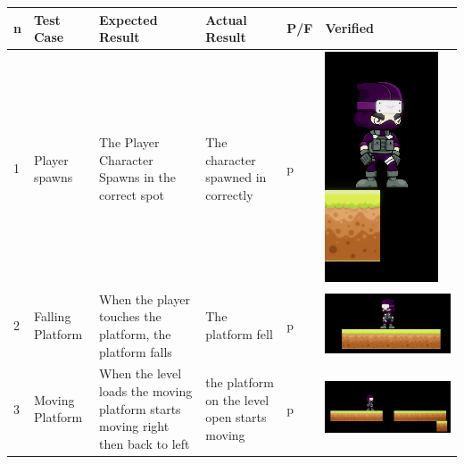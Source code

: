 \documentclass{article}
\begin{document}
\begin{center}		                               
	\begin{tabular}{|m{1em}|m{3em}|m{20em}|m{5em}|m{1.25em}|m{10em}|}
	\hline
		n & Test Case & Expected Result & Actual Result & P/F & Verified  \\
	\hline
	\hline
		1 & Player spawns & The Player Character Spawns in the correct spot & The character spawned in correctly & p & \includegraphics[scale=0.5]{Player spawns} \\
	\hline
		2 & Falling Platform & When the player touches the platform, the platform falls  & The platform fell & p & \includegraphics[scale=0.25]{Falling plat}\\
	\hline
		3 & Moving Platform & When the level loads the moving platform starts moving right then back to left  & the platform on the level open starts moving  & p & \includegraphics[scale=0.15]{Capture} \\

\end{tabular}
\end{center}
\end{document}
